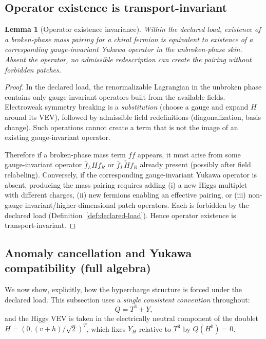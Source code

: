 \documentclass[11pt]{article}
\newtheorem{lemma}[definition]{Lemma}
\theoremstyle{remark}
\begin{document}
\subsection{Operator existence is transport-invariant}

\begin{lemma}[Operator existence invariance]\label{lem:operator}
Within the declared load, existence of a broken-phase mass pairing for a chiral fermion is equivalent
to existence of a corresponding gauge-invariant Yukawa operator in the unbroken-phase skin.
Absent the operator, no admissible redescription can create the pairing without forbidden patches.
\end{lemma}

\begin{proof}
In the declared load, the renormalizable Lagrangian in the unbroken phase contains only gauge-invariant
operators built from the available fields.
Electroweak symmetry breaking is a \emph{substitution} (choose a gauge and expand $H$ around its VEV),
followed by admissible field redefinitions (diagonalization, basis change). Such operations cannot
create a term that is not the image of an existing gauge-invariant operator.

Therefore if a broken-phase mass term $\bar f f$ appears, it must arise from some gauge-invariant
operator $\bar f_L H f_R$ or $\bar f_L\tilde H f_R$ already present (possibly after field relabeling).
Conversely, if the corresponding gauge-invariant Yukawa operator is absent, producing the mass pairing
requires adding (i) a new Higgs multiplet with different charges, (ii) new fermions enabling an
effective pairing, or (iii) non-gauge-invariant/higher-dimensional patch operators. Each is forbidden
by the declared load (Definition~\ref{def:declared-load}). Hence operator existence is transport-invariant.
\end{proof}

\subsection{Anomaly cancellation and Yukawa compatibility (full algebra)}\label{sec:anom-yuk}

We now show, explicitly, how the hypercharge structure is forced under the declared load.
This subsection uses a \emph{single consistent convention} throughout:
\[
Q = T^3 + Y,
\]
and the Higgs VEV is taken in the electrically neutral component of the doublet
$H=(0,(v+h)/\sqrt2)^T$, which fixes $Y_H$ relative to $T^3$ by $Q(H^0)=0$.
\end{document}
